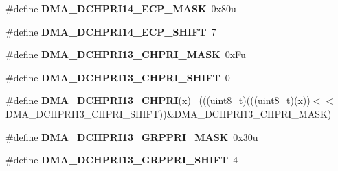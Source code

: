 \begin{DoxyCompactItemize}
\item 
\hypertarget{group___d_m_a___register___masks_gadcb3065c2c242e3728282cb36d891952}{}\#define {\bfseries D\+M\+A\+\_\+\+D\+C\+H\+P\+R\+I14\+\_\+\+E\+C\+P\+\_\+\+M\+A\+S\+K}~0x80u\label{group___d_m_a___register___masks_gadcb3065c2c242e3728282cb36d891952}

\item 
\hypertarget{group___d_m_a___register___masks_gaa7495718e9a8dc1cf79def8e6053472f}{}\#define {\bfseries D\+M\+A\+\_\+\+D\+C\+H\+P\+R\+I14\+\_\+\+E\+C\+P\+\_\+\+S\+H\+I\+F\+T}~7\label{group___d_m_a___register___masks_gaa7495718e9a8dc1cf79def8e6053472f}

\item 
\hypertarget{group___d_m_a___register___masks_gad9e91383771ebbcea15c43585eada037}{}\#define {\bfseries D\+M\+A\+\_\+\+D\+C\+H\+P\+R\+I13\+\_\+\+C\+H\+P\+R\+I\+\_\+\+M\+A\+S\+K}~0x\+Fu\label{group___d_m_a___register___masks_gad9e91383771ebbcea15c43585eada037}

\item 
\hypertarget{group___d_m_a___register___masks_ga71e8be2fe53b3e57287a73d382467140}{}\#define {\bfseries D\+M\+A\+\_\+\+D\+C\+H\+P\+R\+I13\+\_\+\+C\+H\+P\+R\+I\+\_\+\+S\+H\+I\+F\+T}~0\label{group___d_m_a___register___masks_ga71e8be2fe53b3e57287a73d382467140}

\item 
\hypertarget{group___d_m_a___register___masks_ga41a85426787d6f2b754938f6dd3cb894}{}\#define {\bfseries D\+M\+A\+\_\+\+D\+C\+H\+P\+R\+I13\+\_\+\+C\+H\+P\+R\+I}(x)                                    ~(((uint8\+\_\+t)(((uint8\+\_\+t)(x))$<$$<$D\+M\+A\+\_\+\+D\+C\+H\+P\+R\+I13\+\_\+\+C\+H\+P\+R\+I\+\_\+\+S\+H\+I\+F\+T))\&D\+M\+A\+\_\+\+D\+C\+H\+P\+R\+I13\+\_\+\+C\+H\+P\+R\+I\+\_\+\+M\+A\+S\+K)\label{group___d_m_a___register___masks_ga41a85426787d6f2b754938f6dd3cb894}

\item 
\hypertarget{group___d_m_a___register___masks_ga716ca76c204fc3099e92fa072841bfd4}{}\#define {\bfseries D\+M\+A\+\_\+\+D\+C\+H\+P\+R\+I13\+\_\+\+G\+R\+P\+P\+R\+I\+\_\+\+M\+A\+S\+K}~0x30u\label{group___d_m_a___register___masks_ga716ca76c204fc3099e92fa072841bfd4}

\item 
\hypertarget{group___d_m_a___register___masks_ga060bcf0c75d4e8fd7303b3c5a5555820}{}\#define {\bfseries D\+M\+A\+\_\+\+D\+C\+H\+P\+R\+I13\+\_\+\+G\+R\+P\+P\+R\+I\+\_\+\+S\+H\+I\+F\+T}~4\label{group___d_m_a___register___masks_ga060bcf0c75d4e8fd7303b3c5a5555820}


\end{DoxyCompactItemize}
